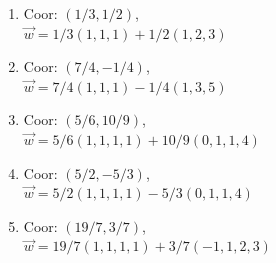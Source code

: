 {\begin{multicols}{2}
\begin{enumerate}
\begin{enumerate}
\item 
Coor: $(1/3, 1/2)$,\\
$\vec w = 1/3(1,1,1)+1/2(1,2,3)$

\item 
Coor: $(7/4, -1/4)$,\\
$\vec w = 7/4(1,1,1)-1/4(1,3,5)$

\item 
Coor: $(5/6,10/9)$,\\
$\vec w = 5/6(1,1,1,1)+10/9(0,1,1,4)$

\item 
Coor: $(5/2,-5/3)$,\\
$\vec w = 5/2(1,1,1,1)-5/3(0,1,1,4)$

\item 
Coor: $(19/7, 3/7)$,\\
$\vec w =19/7(1,1,1,1)+3/7(-1,1,2,3)$

\end{enumerate}










	
\end{enumerate}


\end{multicols}
}




